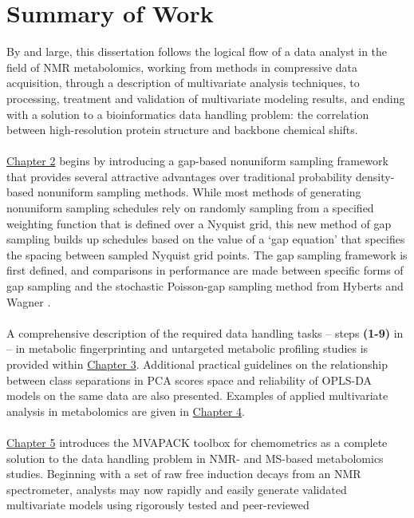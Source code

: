 \section{Summary of Work}

\begin{doublespace}
By and large, this dissertation follows the logical flow of a data analyst
in the field of NMR metabolomics, working from methods in compressive data
acquisition, through a description of multivariate analysis techniques, to
processing, treatment and validation of multivariate modeling results, and
ending with a solution to a bioinformatics data handling problem: the
correlation between high-resolution protein structure and backbone chemical
shifts.
\\\\
\hyperlink{chapter.2}{Chapter 2} begins by introducing a gap-based nonuniform
sampling framework that provides several attractive advantages over traditional
probability density-based nonuniform sampling methods. While most methods of
generating nonuniform sampling schedules rely on randomly sampling from a
specified weighting function that is defined over a Nyquist grid, this new
method of gap sampling builds up schedules based on the value of a `gap
equation' that specifies the spacing between sampled Nyquist grid points. The
gap sampling framework is first defined, and comparisons in performance are
made between specific forms of gap sampling and the stochastic Poisson-gap
sampling method from Hyberts and Wagner \cite{hyberts:jacs2010}.
\\\\
A comprehensive description of the required data handling tasks -- steps
{\bf (1-9)} in  -- in metabolic fingerprinting and
untargeted metabolic profiling studies is provided within
\hyperlink{chapter.3}{Chapter 3}. Additional practical guidelines on the
relationship between class separations in PCA scores space and reliability
of OPLS-DA models on the same data are also presented. Examples of applied
multivariate analysis in metabolomics are given in
\hyperlink{chapter.4}{Chapter 4}.
\\\\
\hyperlink{chapter.5}{Chapter 5} introduces the MVAPACK toolbox for
chemometrics as a complete solution to the data handling problem in NMR-
and MS-based metabolomics studies. Beginning with a set of raw free induction
decays from an NMR spectrometer, analysts may now rapidly and easily generate
validated multivariate models using rigorously tested and peer-reviewed

\end{doublespace}
